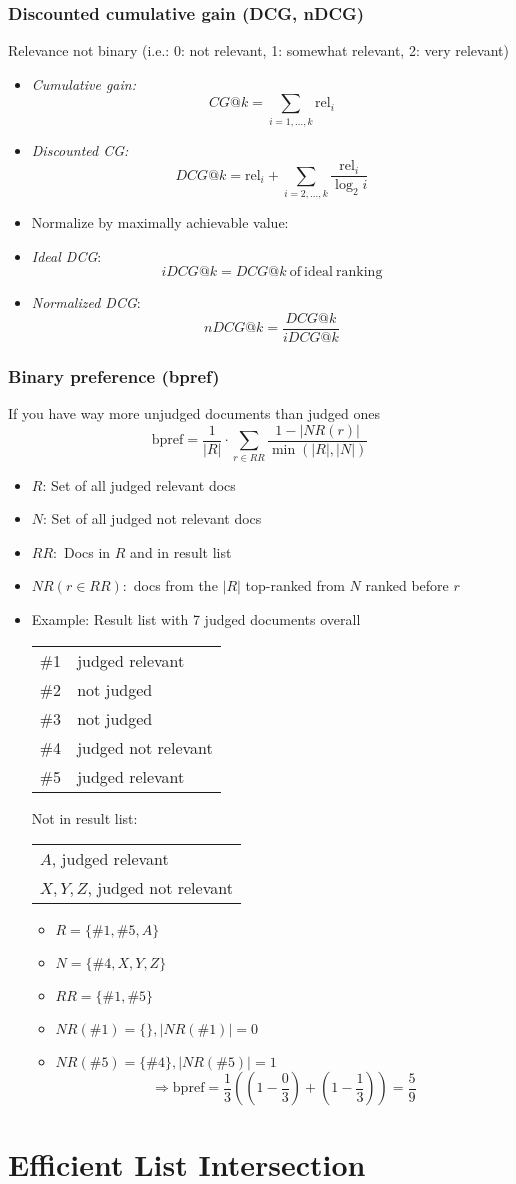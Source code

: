 \documentclass[a4paper]{scrartcl}
\begin{document}
\subsubsection{Discounted cumulative gain (DCG, nDCG)}
Relevance not binary (i.e.: 0: not relevant, 1: somewhat relevant, 2: very
relevant)
\begin{itemize}
\item \emph{Cumulative gain:} \[CG@k=\sum_{i=1,...,k} \mathrm{rel}_i\]
\item \emph{Discounted CG:} \[DCG@k = \mathrm{rel}_i +
  \sum_{i=2,...,k}\frac{\mathrm{rel}_i}{\log_2 i}\]
\item Normalize by maximally achievable value:
\item \emph{Ideal DCG}: \[iDCG@k=DCG@k\ \mathrm{of\ ideal\ ranking}\]
\item \emph{Normalized DCG}: \[nDCG@k = \frac{DCG@k}{iDCG@k}\]
\end{itemize}

\subsubsection{Binary preference (bpref)}
If you have way more unjudged documents than judged ones
\[\mathrm{bpref}=\frac{1}{|R|}\cdot\sum_{r\in RR}\frac{1-|NR(r)|}{\min(|R|,|N|)}\]
\begin{itemize}
\item $R$: Set of all judged relevant docs
\item $N$: Set of all judged not relevant docs
\item $RR:$ Docs in $R$ and in result list
\item $NR(r\in RR):$ docs from the $|R|$ top-ranked from $N$ ranked before $r$
\item Example: Result list with 7 judged documents overall\\ 
    \begin{tabular}{ll|}
      \#1&judged relevant\\
      \#2&not judged\\
      \#3&not judged\\
      \#4&judged not relevant\\
      \#5&judged relevant\\
    \end{tabular}
    Not in result list:
    \begin{tabular}{l}
      $A$, judged relevant \\
      $X, Y, Z$, judged not relevant
    \end{tabular}
    \begin{itemize}
    \item $R=\{\#1, \#5, A\} $
    \item $N=\{\#4, X, Y, Z\}$
    \item $RR=\{\#1,\#5\}$
    \item $NR(\#1)= \{\}, |NR(\#1)|=0$
    \item $NR(\#5)= \{\#4\}, |NR(\#5)|=1$
\[\Rightarrow\mathrm{bpref} = \frac{1}{3}\left( \left( 1-\frac{0}{3} \right) +
        \left( 1-\frac{1}{3} \right) \right) = \frac{5}{9}\]
    \end{itemize}
\end{itemize}

\section{Efficient List Intersection}
\end{document}
